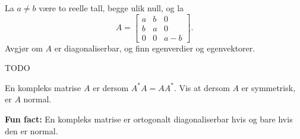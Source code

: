 \begin{oppgave}
La $ a\neq b$ være to reelle tall, begge ulik null, og la
$$A=
\begin{bmatrix}
a & b & 0\\
b & a & 0\\
0 & 0 & a-b
\end{bmatrix}.$$
Avgjør om $A$ er diagonaliserbar, og finn egenverdier og egenvektorer.
\end{oppgave}


\begin{losning}
TODO
\end{losning}






\begin{oppgave}
En kompleks matrise $A$ er  dersom $A^*A=AA^*$. 
Vis at dersom $A$ er symmetrisk, er $A$ normal. 

\textbf{Fun fact:} En kompleks matrise er ortogonalt diagonaliserbar hvis og bare hvis den er normal.
\end{oppgave}


